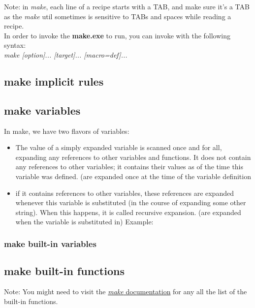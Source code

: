 \documentclass{article}
\begin{document}
Note: in \textit{make}, each line of a recipe starts with a TAB, and make sure it's a TAB as the \textit{make} util sometimes is sensitive to TABs and spaces while reading a recipe.\\

In order to invoke the \textbf{make.exe} to run, you can invoke with the following syntax:\\
\textit{make [option]... [target]... [macro=def]...}

\subsection{make implicit rules}

\subsection{make variables}
In make, we have two flavors of variables:
\begin{itemize}
    \item The value of a simply expanded variable is scanned once and for all, expanding any references to other variables and functions. It does not contain any references to other variables; it contains their values as of the time this variable was defined. (are expanded once at the time of the variable definition
    \item if it contains references to other variables, these references are expanded whenever this variable is substituted (in the course of expanding some other string). When this happens, it is called recursive expansion. (are expanded when the variable is substituted in)
Example:


\end{itemize}

\subsubsection{make built-in variables}

\subsection{make built-in functions}

Note: You might need to visit the \href{https://www.gnu.org/software/make/manual/html_node/Functions.html}{\textit{make} documentation} for any all the list of the built-in functions.
\end{document}
